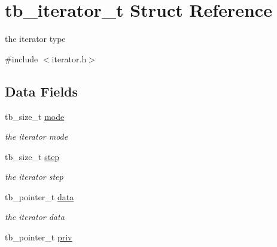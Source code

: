 \hypertarget{structtb__iterator__t}{\section{tb\-\_\-iterator\-\_\-t Struct Reference}
\label{structtb__iterator__t}
}


the iterator type  




{\ttfamily \#include $<$iterator.\-h$>$}

\subsection*{Data Fields}
\begin{DoxyCompactItemize}
\item 
\hypertarget{structtb__iterator__t_a0a6e5a9fda7a9be4045759170b93f461}{tb\-\_\-size\-\_\-t \hyperlink{structtb__iterator__t_a0a6e5a9fda7a9be4045759170b93f461}{mode}}\label{structtb__iterator__t_a0a6e5a9fda7a9be4045759170b93f461}

\begin{DoxyCompactList}\small\item\em the iterator mode \end{DoxyCompactList}\item 
\hypertarget{structtb__iterator__t_a211161fb8d0f816b60203355965c88fc}{tb\-\_\-size\-\_\-t \hyperlink{structtb__iterator__t_a211161fb8d0f816b60203355965c88fc}{step}}\label{structtb__iterator__t_a211161fb8d0f816b60203355965c88fc}

\begin{DoxyCompactList}\small\item\em the iterator step \end{DoxyCompactList}\item 
\hypertarget{structtb__iterator__t_a01cd43be7b84f8d4d2596f423cd78368}{tb\-\_\-pointer\-\_\-t \hyperlink{structtb__iterator__t_a01cd43be7b84f8d4d2596f423cd78368}{data}}\label{structtb__iterator__t_a01cd43be7b84f8d4d2596f423cd78368}

\begin{DoxyCompactList}\small\item\em the iterator data \end{DoxyCompactList}\item 
\hypertarget{structtb__iterator__t_a5bd34b966c835ac57a10554c98e755ac}{tb\-\_\-pointer\-\_\-t \hyperlink{structtb__iterator__t_a5bd34b966c835ac57a10554c98e755ac}{priv}}\label{structtb__iterator__t_a5bd34b966c835ac57a10554c98e755ac}


\end{DoxyCompactItemize}
